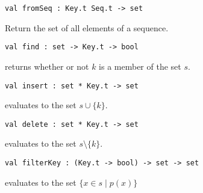 \begin{cluster}
\label{grp:grm:set-interface::fromseq}

\begin{gram}[fromSeq]
\label{grm:set-interface::fromseq}
\begin{verbatim}
val fromSeq : Key.t Seq.t -> set
\end{verbatim}
Return the set of all elements of a sequence.

\end{gram}
\end{cluster}

\begin{cluster}
\label{grp:grm:set-interface::find}

\begin{gram}[find]
\label{grm:set-interface::find}
\begin{verbatim}
val find : set -> Key.t -> bool
\end{verbatim}
 returns whether or not $k$ is a member of the set $s$.

\end{gram}
\end{cluster}

\begin{cluster}
\label{grp:grm:set-interface::insert}

\begin{gram}[insert]
\label{grm:set-interface::insert}
\begin{verbatim}
val insert : set * Key.t -> set
\end{verbatim}
 evaluates to the set $s \cup \{k\}$.

\end{gram}
\end{cluster}

\begin{cluster}
\label{grp:grm:set-interface::delete}

\begin{gram}[delete]
\label{grm:set-interface::delete}
\begin{verbatim}
val delete : set * Key.t -> set
\end{verbatim}
 evaluates to the set $s \setminus \{k\}$.

\end{gram}
\end{cluster}

\begin{cluster}
\label{grp:grm:set-interface::filterkey}

\begin{gram}[filterKey]
\label{grm:set-interface::filterkey}
\begin{verbatim}
val filterKey : (Key.t -> bool) -> set -> set
\end{verbatim}
 evaluates to the set $\{x \in s \mathbin| p(x) \}$

\end{gram}
\end{cluster}

